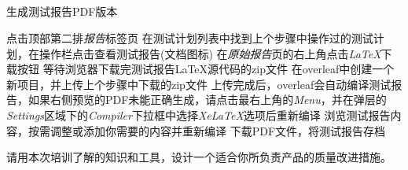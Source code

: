 \documentclass[12pt,addpoints,fleqn]{exam}
\begin{document}
\begin{questions}
\begin{parts}
  \part{}生成测试报告PDF版本
  \begin{subparts}
    \subpart{}点击顶部第二排\emph{报告}标签页
    \subpart{}在测试计划列表中找到上个步骤中操作过的测试计划，在操作栏点击查看测试报告(文档图标)
    \subpart{}在\emph{原始报告}页的右上角点击\emph{LaTeX}下载按钮
    \subpart{}等待浏览器下载完测试报告LaTeX源代码的zip文件
    \subpart{}在overleaf中创建一个新项目，并上传上个步骤中下载的zip文件
    \subpart{}上传完成后，overleaf会自动编译测试报告，如果右侧预览的PDF未能正确生成，请点击最右上角的\emph{Menu}，并在弹层的\emph{Settings}区域下的\emph{Compiler}下拉框中选择\emph{XeLaTeX}选项后重新编译
    \subpart{}浏览测试报告内容，按需调整或添加你需要的内容并重新编译
    \subpart{}下载PDF文件，将测试报告存档
  \end{subparts}

\end{parts}
\newpage
\question[20] 
请用本次培训了解的知识和工具，设计一个适合你所负责产品的质量改进措施。

\end{questions}
\end{document}
